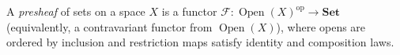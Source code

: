 
A \emph{presheaf} of sets on a space $X$ is a functor $\mathcal F:\operatorname{Open}(X)^{\mathrm{op}}\to\mathbf{Set}$ (equivalently, a contravariant functor from $\operatorname{Open}(X)$), where opens are ordered by inclusion and restriction maps satisfy identity and composition laws.
